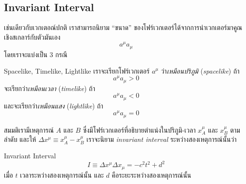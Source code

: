 \subsection{Invariant Interval}

เช่นเดียวกับเวกเตอณ์ปกติ เราสามารถนิยาม ``ขนาด'' ของโฟร์เวกเตอร์ได้จากการนำเวกเตอร์มาคูณเชิงสเกลาร์กับตัวมันเอง
\[
a^\mu a_\mu
\]
โดยเราจะแบ่งเป็น $3$ กรณี
\begin{defbox}{ Spacelike, Timelike, Lightlike}
    เราจะเรียกโฟร์เวกเตอร์ $a^\mu$ ว่า\emph{เหมือนปริภูมิ} (\emph{spacelike}) ถ้า
    \[
    a^\mu a_\mu > 0
    \]
    จะเรียกว่า\emph{เหมือนเวลา} (\emph{timelike}) ถ้า
    \[
    a^\mu a_\mu < 0
    \]
    และจะเรียกว่า\emph{เหมือนแสง} (\emph{lightlike}) ถ้า
    \[
    a^\mu a_\mu = 0
    \]
\end{defbox}

สมมติเรามีเหตุการณ์ $A$ และ $B$ ซึ่งมีโฟร์เวกเตอร์ที่อธิบายตำแน่งในปริภูมิ-เวลา $x_A^\mu$ และ $x_B^\mu$ ตามลำดับ และให้ $\Delta x^\mu \equiv x_A^\mu - x_B^\mu$ เราจะนิยาม \emph{invariant interval} ระหว่างสองเหตุการณ์นั้นว่า
\begin{defbox}{ Invariant Interval}
    \begin{equation}
        I \equiv \Delta x^\mu\Delta x_\mu = -c^2t^2 + d^2
    \end{equation}
    เมื่อ $t$ เวลาระหว่างสองเหตุการณ์นั้น และ $d$ คือระยะระหว่างสองเหตุการณ์นั้น
\end{defbox}
